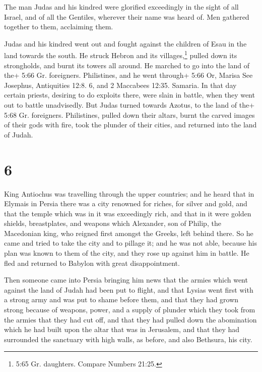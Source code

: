  The man Judas and his kindred were glorified exceedingly
in the sight of all Israel, and of all the Gentiles, wherever their name
was heard of.  Men gathered together to them, acclaiming
them.

 Judas and his kindred went out and fought against the
children of Esau in the land towards the south. He struck Hebron and its
villages,\footnote{5:65 Gr. daughters. Compare Numbers 21:25.} pulled
down its strongholds, and burnt its towers all around.  He
marched to go into the land of the+ 5:66 Gr. foreigners. Philistines,
and he went through+ 5:66 Or, Marisa See Josephus, Antiquities 12:8. 6,
and 2 Maccabees 12:35. Samaria.  In that day certain
priests, desiring to do exploits there, were slain in battle, when they
went out to battle unadvisedly.  But Judas turned towards
Azotus, to the land of the+ 5:68 Gr. foreigners. Philistines, pulled
down their altars, burnt the carved images of their gods with fire, took
the plunder of their cities, and returned into the land of Judah.

\hypertarget{section-5}{%
\section{6}\label{section-5}}

 King Antiochus was travelling through the upper countries;
and he heard that in Elymais in Persia there was a city renowned for
riches, for silver and gold,  and that the temple which was
in it was exceedingly rich, and that in it were golden shields,
breastplates, and weapons which Alexander, son of Philip, the Macedonian
king, who reigned first amongst the Greeks, left behind there.
 So he came and tried to take the city and to pillage it;
and he was not able, because his plan was known to them of the city,
 and they rose up against him in battle. He fled and
returned to Babylon with great disappointment.

 Then someone came into Persia bringing him news that the
armies which went against the land of Judah had been put to flight,
 and that Lysias went first with a strong army and was put
to shame before them, and that they had grown strong because of weapons,
power, and a supply of plunder which they took from the armies that they
had cut off,  and that they had pulled down the abomination
which he had built upon the altar that was in Jerusalem, and that they
had surrounded the sanctuary with high walls, as before, and also
Bethsura, his city.

